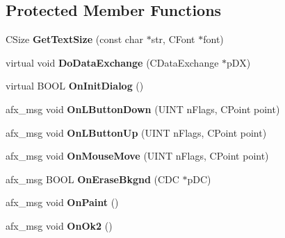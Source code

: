 \subsection*{Protected Member Functions}
\begin{DoxyCompactItemize}
\item 
\hypertarget{class_c_msg_box_afff6c64f382bfa4684c253d1e9be8db4}{C\-Size {\bfseries Get\-Text\-Size} (const char $\ast$str, C\-Font $\ast$font)}\label{class_c_msg_box_afff6c64f382bfa4684c253d1e9be8db4}

\item 
\hypertarget{class_c_msg_box_abefb1780083aedd63321a28cba25d53f}{virtual void {\bfseries Do\-Data\-Exchange} (C\-Data\-Exchange $\ast$p\-D\-X)}\label{class_c_msg_box_abefb1780083aedd63321a28cba25d53f}

\item 
\hypertarget{class_c_msg_box_ab552f1e5d1a77cde5ddaf86766d213b1}{virtual B\-O\-O\-L {\bfseries On\-Init\-Dialog} ()}\label{class_c_msg_box_ab552f1e5d1a77cde5ddaf86766d213b1}

\item 
\hypertarget{class_c_msg_box_a5e4449548aeb18823ad3bf620ee3d477}{afx\-\_\-msg void {\bfseries On\-L\-Button\-Down} (U\-I\-N\-T n\-Flags, C\-Point point)}\label{class_c_msg_box_a5e4449548aeb18823ad3bf620ee3d477}

\item 
\hypertarget{class_c_msg_box_adc045516745c9eafd6cadddeb27e0697}{afx\-\_\-msg void {\bfseries On\-L\-Button\-Up} (U\-I\-N\-T n\-Flags, C\-Point point)}\label{class_c_msg_box_adc045516745c9eafd6cadddeb27e0697}

\item 
\hypertarget{class_c_msg_box_a93748756fe204095eb0b0b3553d5dd48}{afx\-\_\-msg void {\bfseries On\-Mouse\-Move} (U\-I\-N\-T n\-Flags, C\-Point point)}\label{class_c_msg_box_a93748756fe204095eb0b0b3553d5dd48}

\item 
\hypertarget{class_c_msg_box_ad956bd99d501fddb9dd610b604c50048}{afx\-\_\-msg B\-O\-O\-L {\bfseries On\-Erase\-Bkgnd} (C\-D\-C $\ast$p\-D\-C)}\label{class_c_msg_box_ad956bd99d501fddb9dd610b604c50048}

\item 
\hypertarget{class_c_msg_box_afd654a4763691eb27d73b4bccdc532b9}{afx\-\_\-msg void {\bfseries On\-Paint} ()}\label{class_c_msg_box_afd654a4763691eb27d73b4bccdc532b9}

\item 
\hypertarget{class_c_msg_box_a0850f5407fffe00186226fe6794e54e5}{afx\-\_\-msg void {\bfseries On\-Ok2} ()}\label{class_c_msg_box_a0850f5407fffe00186226fe6794e54e5}


\end{DoxyCompactItemize}
